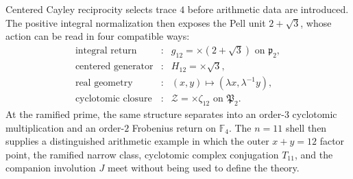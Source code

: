 \documentclass[11pt]{article}
\theoremstyle{definition}
\theoremstyle{remark}
\newcommand{\F}{\mathbb F}
\begin{document}
Centered Cayley reciprocity selects trace $4$ before arithmetic data are
introduced.  The positive integral normalization then exposes the Pell unit
$2+\sqrt3$, whose action can be read in four compatible ways:
\[
\boxed{
\begin{array}{ccl}
\text{integral return} &:& g_{12}=\times(2+\sqrt3)\text{ on }\mathfrak p_2,\\
\text{centered generator} &:& H_{12}=\times\sqrt3,\\
\text{real geometry} &:& (x,y)\mapsto(\lambda x,\lambda^{-1}y),\\
\text{cyclotomic closure} &:& \mathcal Z=\times\zeta_{12}\text{ on }\mathfrak P_2.
\end{array}}
\]
At the ramified prime, the same structure separates into an order-$3$
cyclotomic multiplication and an order-$2$ Frobenius return on $\F_4$.  The
$n=11$ shell then supplies a distinguished arithmetic example in which the
outer $x+y=12$ factor point, the ramified narrow class, cyclotomic complex
conjugation $T_{11}$, and the companion involution $J$ meet without being used
to define the theory.
\end{document}
